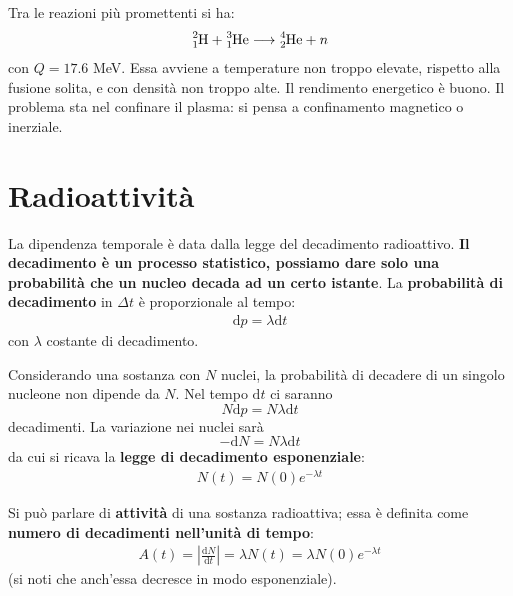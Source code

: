 \documentclass[a4paper,11pt,twoside,openany]{book}
\theoremstyle{definition}
\theoremstyle{plain}
\theoremstyle{plain}
\theoremstyle{definition}
\begin{document}
Tra le reazioni più promettenti si ha:
\begin{equation*}\begin{split}
\ce{^2_1H}+\ce{^3_1He}\longrightarrow \ce{^4_2He}+n
\end{split}\end{equation*}
con $Q=17.6$ MeV. Essa avviene a temperature non troppo elevate, rispetto alla fusione solita, e con densità non troppo alte. Il rendimento energetico è buono. Il problema sta nel confinare il plasma: si pensa a confinamento magnetico o inerziale.

\chapter{Radioattività} %
La dipendenza temporale è data dalla legge del decadimento radioattivo. \textbf{Il decadimento è un processo statistico, possiamo dare solo una probabilità che un nucleo decada ad un certo istante}. La \textbf{probabilità di decadimento} in $\Delta t$ è proporzionale al tempo:
\begin{equation}\begin{split}
\textrm{d}p=\lambda \textrm{d}t
\end{split}\end{equation}
con $\lambda$ costante di decadimento.

Considerando una sostanza con $N$ nuclei, la probabilità di decadere di un singolo nucleone non dipende da $N$. Nel tempo $\textrm{d}t$ ci saranno $$N\textrm{d}p=N\lambda \textrm{d}t$$ decadimenti. La variazione nei nuclei sarà $$-\textrm{d}N=N\lambda \textrm{d}t$$ da cui si ricava la \textbf{legge di decadimento esponenziale}:
\begin{equation}\begin{split}
N\left(t\right)=N\left(0\right)e^{-\lambda t}
\end{split}\end{equation}

Si può parlare di \textbf{attività} di una sostanza radioattiva; essa è definita come \textbf{numero di decadimenti nell'unità di tempo}:
\begin{equation}\begin{split}
A\left(t\right)=\left|\frac{\textrm{d}N}{\textrm{d}t}\right|=\lambda N\left(t\right)=\lambda N\left(0\right)e^{-\lambda t}
\end{split}\end{equation}
(si noti che anch'essa decresce in modo esponenziale).
\end{document}
